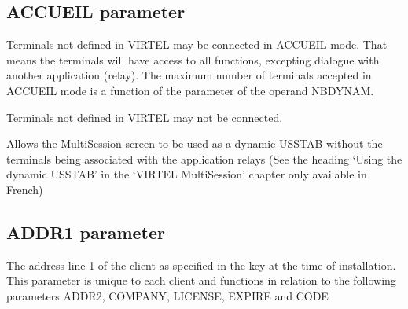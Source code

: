 \documentclass[letterpaper,10pt,english]{sphinxmanual}
\begin{document}
\subsection{ACCUEIL parameter}
\label{\detokenize{Installation_Guide:accueil-parameter}}\label{\detokenize{Installation_Guide:index-30}}
\begin{sphinxVerbatim}[commandchars=\\\{\}]
\PYG{p}{[}\PYG{p}{]} 
\end{sphinxVerbatim}

\sphinxAtStartPar
{} \sphinxhyphen{} Terminals not defined in VIRTEL may be connected in ACCUEIL mode. That means the terminals will have access to all functions, excepting dialogue with another application (relay). The maximum number of terminals accepted in ACCUEIL mode is a function of the parameter of the operand NBDYNAM.

\sphinxAtStartPar
{} \sphinxhyphen{} Terminals not defined in VIRTEL may not be connected.

\sphinxAtStartPar
{} \sphinxhyphen{} Allows the Multi\sphinxhyphen{}Session screen to be used as a dynamic USSTAB without the terminals being associated with the application relays (See the heading ‘Using the dynamic USSTAB’ in the ‘VIRTEL Multi\sphinxhyphen{}Session’ chapter only available in French)

\ignorespaces 

\subsection{ADDR1 parameter}
\label{\detokenize{Installation_Guide:addr1-parameter}}\label{\detokenize{Installation_Guide:index-31}}
\begin{sphinxVerbatim}[commandchars=\\\{\}]
 
\end{sphinxVerbatim}

\sphinxAtStartPar
The address line 1 of the client as specified in the key at the time of installation. This parameter is unique to each client and functions in relation to the following parameters ADDR2, COMPANY, LICENSE, EXPIRE and CODE
\end{document}
